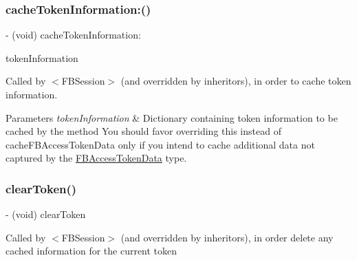 \subsubsection{\texorpdfstring{cache\+Token\+Information\+:()}{cacheTokenInformation:()}\hspace{0.1cm}{\footnotesize\ttfamily [5/5]}}
{\footnotesize\ttfamily -\/ (void) cache\+Token\+Information\+: \begin{DoxyParamCaption}\item[{(N\+S\+Dictionary $\ast$)}]{token\+Information }\end{DoxyParamCaption}}

Called by $<$\+F\+B\+Session$>$ (and overridden by inheritors), in order to cache token information.


\begin{DoxyParams}{Parameters}
{\em token\+Information} & Dictionary containing token information to be cached by the method  You should favor overriding this instead of {\ttfamily cache\+F\+B\+Access\+Token\+Data} only if you intend to cache additional data not captured by the \hyperlink{interfaceFBAccessTokenData}{F\+B\+Access\+Token\+Data} type. \\
\hline
\end{DoxyParams}
\mbox{\label{interfaceFBSessionTokenCachingStrategy_a4cc3c2711517839cecad4b3047a28f85}} 
\subsubsection{\texorpdfstring{clear\+Token()}{clearToken()}\hspace{0.1cm}{\footnotesize\ttfamily [1/5]}}
{\footnotesize\ttfamily -\/ (void) clear\+Token \begin{DoxyParamCaption}{ }\end{DoxyParamCaption}}

Called by $<$\+F\+B\+Session$>$ (and overridden by inheritors), in order delete any cached information for the current token \mbox{\label{interfaceFBSessionTokenCachingStrategy_a4cc3c2711517839cecad4b3047a28f85}} 

